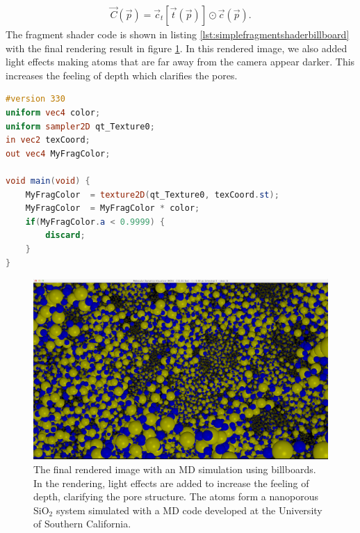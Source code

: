 \begin{align}
	\nonumber
	\vec C(\vec p) = \vec c_t[\vec t(\vec p)] \odot \vec c(\vec p).
\end{align}
The fragment shader code is shown in listing \ref{lst:simplefragmentshaderbillboard} with the final rendering result in figure \ref{fig:visualization_billboard_md}. In this rendered image, we also added light effects making atoms that are far away from the camera appear darker. This increases the feeling of depth which clarifies the pores.
\begin{lstlisting}[caption=billboardFragmentShader.glsl, label=lst:simplefragmentshaderbillboard, language=GLSL]
#version 330
uniform vec4 color;
uniform sampler2D qt_Texture0;
in vec2 texCoord;
out vec4 MyFragColor;

void main(void) {
    MyFragColor  = texture2D(qt_Texture0, texCoord.st);
    MyFragColor  = MyFragColor * color;
    if(MyFragColor.a < 0.9999) {
        discard;
    }
}

\end{lstlisting}

\begin{figure}[h]
\begin{center}
\includegraphics[width=\textwidth, trim=0cm 0cm 0cm 0cm, clip]{visualization/figures/billboards_md_visualization.png}
\end{center}
\caption{The final rendered image with an MD simulation using billboards. In the rendering, light effects are added to increase the feeling of depth, clarifying the pore structure. The atoms form a nanoporous SiO$_2$ system simulated with a MD code developed at the University of Southern California.}
\label{fig:visualization_billboard_md}
\end{figure}

